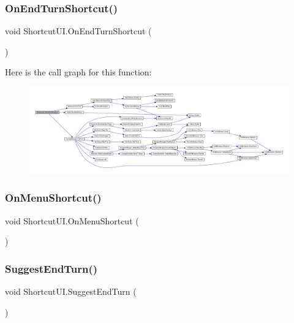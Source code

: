 \subsubsection{\texorpdfstring{OnEndTurnShortcut()}{OnEndTurnShortcut()}}
{\footnotesize\ttfamily void Shortcut\+U\+I.\+On\+End\+Turn\+Shortcut (\begin{DoxyParamCaption}{ }\end{DoxyParamCaption})}

Here is the call graph for this function\+:
\nopagebreak
\begin{figure}[H]
\begin{center}
\leavevmode
\includegraphics[width=350pt]{class_shortcut_u_i_ac6c1705acfb6d8393f36a73810d94958_cgraph}
\end{center}
\end{figure}
\mbox{\label{class_shortcut_u_i_a71824a1037ebef08af0938c0d731a498}} 
\subsubsection{\texorpdfstring{OnMenuShortcut()}{OnMenuShortcut()}}
{\footnotesize\ttfamily void Shortcut\+U\+I.\+On\+Menu\+Shortcut (\begin{DoxyParamCaption}{ }\end{DoxyParamCaption})}

\mbox{\label{class_shortcut_u_i_a501d7c10166dca42125d04c805c617d1}} 
\subsubsection{\texorpdfstring{SuggestEndTurn()}{SuggestEndTurn()}}
{\footnotesize\ttfamily void Shortcut\+U\+I.\+Suggest\+End\+Turn (\begin{DoxyParamCaption}{ }\end{DoxyParamCaption})}

